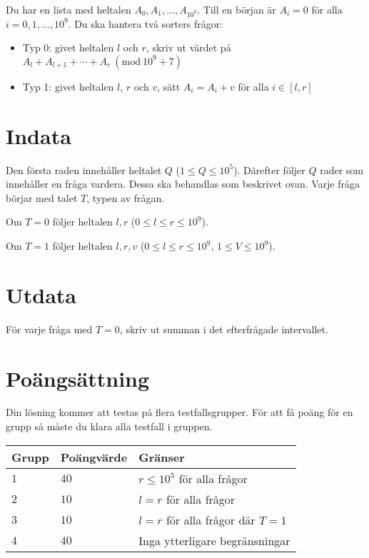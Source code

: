 \newcommand{\Mod}[1]{\ (\mathrm{mod}\ #1)}

Du har en lista med heltalen $A_0, A_1, \dots, A_{10^9}$. Till en början är $A_i=0$ för alla $i=0,1,\dots,10^9$.
Du ska hantera två sorters frågor:

\begin{itemize}
    \item Typ 0: givet heltalen $l$ och $r$, skriv ut värdet på  $A_l + A_{l+1} + \cdots + A_{r} \Mod{10^9+7}$
    \item Typ 1: givet heltalen $l$, $r$ och $v$, sätt $A_i=A_i+v$ för alla $i \in [l, r]$
\end{itemize}

\section*{Indata}
Den första raden innehåller heltalet $Q$ ($1 \leq Q \leq 10^5$).
Därefter följer $Q$ rader som innehåller en fråga vardera. Dessa ska behandlas som beskrivet ovan.
Varje fråga börjar med talet $T$, typen av frågan.

Om $T=0$ följer heltalen $l,r$ ($0 \leq l \leq r \leq 10^9$).

Om $T=1$ följer heltalen $l, r, v$ ($0 \leq l \leq r \leq 10^9$, $1 \leq V \leq 10^9$).

\section*{Utdata}
För varje fråga med $T=0$, skriv ut summan i det efterfrågade intervallet.

\section*{Poängsättning}
Din lösning kommer att testas på flera testfallsgrupper.
\noindent
För att få poäng för en grupp så måste du klara alla testfall i gruppen.

\noindent
\begin{tabular}{| l | l | l |}
\hline
  Grupp & Poängvärde & Gränser \\ \hline
  $1$    & $40$       &  $r \leq 10^5$ för alla frågor \\ \hline
  $2$    & $10$       &  $l=r$ för alla frågor \\ \hline
  $3$    & $10$       &  $l=r$ för alla frågor där $T=1$ \\ \hline
  $4$    & $40$       &  Inga ytterligare begränsningar \\ \hline
\end{tabular}
